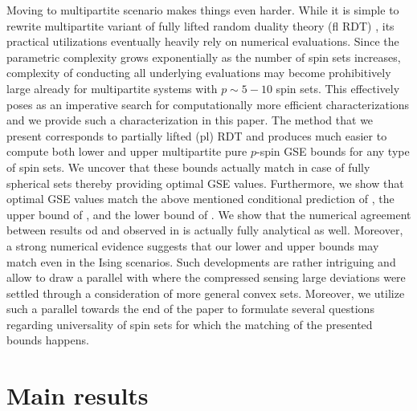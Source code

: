 \documentclass[10pt]{article}
\begin{document}
 Moving to multipartite scenario makes things even harder. While it is simple to rewrite  multipartite variant of fully lifted random duality theory (fl RDT) \cite{Stojnicflrdt23}, its practical utilizations eventually heavily rely on numerical evaluations. Since the parametric complexity  grows exponentially as the number of spin sets increases, complexity of conducting all underlying evaluations may become prohibitively large already for multipartite systems with $p\sim 5-10$ spin sets. This effectively poses as an imperative search for computationally more efficient characterizations and we provide such a characterization in this paper. The method that we present corresponds to partially lifted (pl) RDT and produces much easier to compute both lower and upper multipartite pure $p$-spin GSE bounds for any type of spin sets. We uncover that these bounds actually match in case of fully spherical sets thereby providing optimal GSE values. Furthermore, we show that optimal GSE values match the above mentioned conditional prediction of \cite{Subagtap23b}, the upper bound of \cite{DarMc24}, and the lower bound of \cite{BatesSohn25}. We show that the numerical agreement between results od \cite{Subagtap23b} and \cite{DarMc24} observed in \cite{DarMc24} is actually fully analytical as well. Moreover, a strong numerical evidence suggests that our lower and upper bounds may match even in the Ising scenarios. Such developments are rather intriguing and allow to draw a  parallel with  \cite{Stojnicl1RegPosasym} where  the compressed sensing large deviations were settled through a consideration of more general convex sets. Moreover, we utilize such a parallel  towards the end of the paper to formulate several questions regarding universality of spin sets for which the matching of the presented bounds happens.










\section{Main results}
\label{sec:res}
\end{document}
